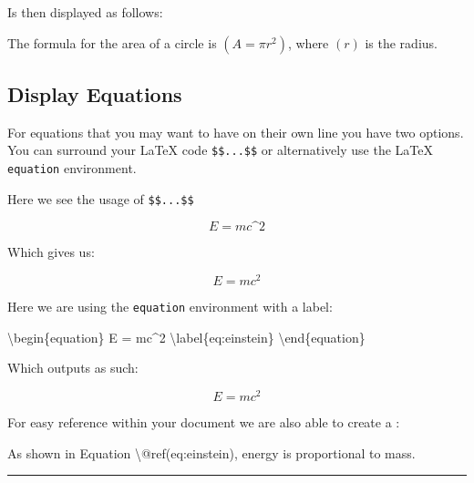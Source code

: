 \documentclass[
]{book}
\newenvironment{Shaded}{\begin{snugshade}}{\end{snugshade}}
\newcommand{\NormalTok}[1]{#1}
\theoremstyle{definition}
\theoremstyle{definition}
\theoremstyle{definition}
\theoremstyle{definition}
\theoremstyle{remark}
\begin{document}
Is then displayed as follows:

The formula for the area of a circle is \(( A = \pi r^2 )\), where \(( r )\) is the radius.

\subsection{Display Equations}\label{display-equations}

For equations that you may want to have on their own line you have two options. You can surround your LaTeX code \texttt{\$\$...\$\$} or alternatively use the LaTeX \texttt{equation} environment.

Here we see the usage of \texttt{\$\$...\$\$}

\begin{Shaded}
\begin{Highlighting}[]
\NormalTok{$$}
\NormalTok{E = mc\^{}2}
\NormalTok{$$}
\end{Highlighting}
\end{Shaded}

Which gives us:

\[
E = mc^2
\]

Here we are using the \texttt{equation} environment with a label:

\begin{Shaded}
\begin{Highlighting}[]

\NormalTok{\textbackslash{}begin\{equation\}}
\NormalTok{  E = mc\^{}2}
\NormalTok{  \textbackslash{}label\{eq:einstein\}}
\NormalTok{\textbackslash{}end\{equation\}}
\end{Highlighting}
\end{Shaded}

Which outputs as such:

\begin{equation}
  E = mc^2
  \label{eq:einstein}
\end{equation}

For easy reference within your document we are also able to create a :

\begin{Shaded}
\begin{Highlighting}[]
\NormalTok{As shown in Equation \textbackslash{}@ref(eq:einstein), energy is proportional to mass.}
\end{Highlighting}
\end{Shaded}

\begin{center}\rule{0.5\linewidth}{0.5pt}\end{center}
\end{document}

